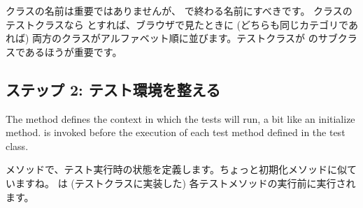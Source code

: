 \documentclass[a4paper,10pt,twoside]{book}
\begin{document}
クラスの名前は重要ではありませんが、  で終わる名前にすべきです。  クラスのテストクラスなら  とすれば、ブラウザで見たときに (どちらも同じカテゴリであれば) 両方のクラスがアルファベット順に並びます。テストクラスが  のサブクラスであるほうが重要です。


\subsection{ステップ 2: テスト環境を整える}

The method  defines the context in which the tests will run, a bit like an initialize method.
 is invoked before the execution of each test
method defined in the test class.
\fi

 メソッドで、テスト実行時の状態を定義します。ちょっと初期化メソッドに似ていますね。  は (テストクラスに実装した) 各テストメソッドの実行前に実行されます。


\if
\end{document}
